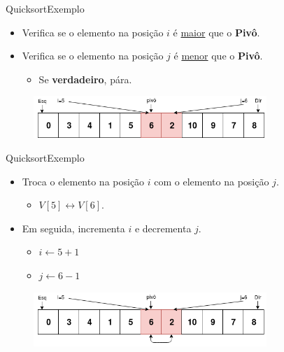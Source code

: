 \documentclass[aspectratio=169]{beamer}
\begin{document}

\begin{frame}{Quicksort}{Exemplo}
\begin{itemize}
 \item Verifica se o elemento na posição $i$ é \underline{maior} que o {\bf Pivô}.
 \item Verifica se o elemento na posição $j$ é \underline{menor} que o {\bf Pivô}.
 \begin{itemize}
 \item Se {\bf verdadeiro}, pára.
 \end{itemize}
\end{itemize}

\begin{figure}[!h]
  \centering
  \includegraphics[width=250pt]{imgs/quick/quick12.png}
  \label{fig_quick12}
\end{figure}
\end{frame}


\begin{frame}{Quicksort}{Exemplo}
\begin{itemize}
 \item Troca o elemento na posição $i$ com o elemento na posição $j$.
 \begin{itemize}
 \item $V[5] \leftrightarrow V[6]$.
 \end{itemize}
 \item Em seguida, incrementa $i$ e decrementa $j$.
 \begin{itemize}
 \item $i \leftarrow 5 + 1$
 \item $j \leftarrow 6 - 1$ 
 \end{itemize} 
\end{itemize}

\begin{figure}[!h]
  \centering
  \includegraphics[width=250pt]{imgs/quick/quick13.png}
  \label{fig_quick13}
\end{figure}
\end{frame}
\end{document}
